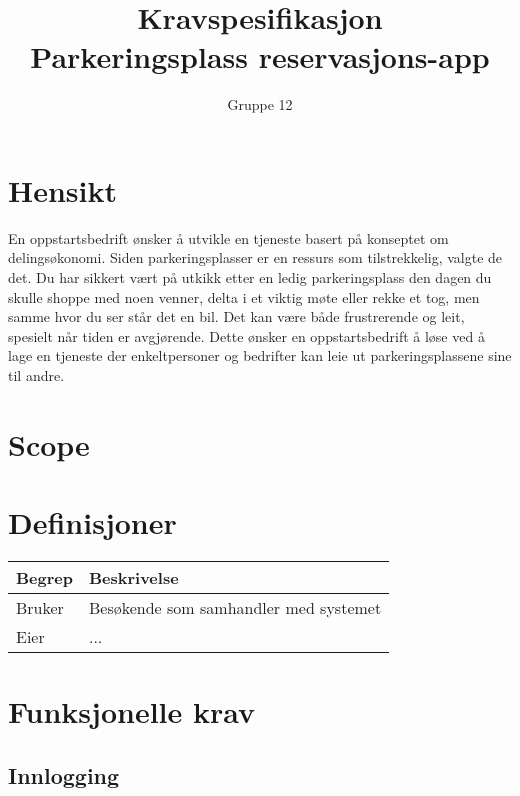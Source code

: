 \documentclass[12pt]{article}
\begin{document}
\title{%
    Kravspesifikasjon\\
    \large Parkeringsplass reservasjons-app }
\author{Gruppe 12}
\date{}
\maketitle

\newpage

\tableofcontents

\newpage

\section{Hensikt}
En oppstartsbedrift ønsker å utvikle en tjeneste basert på konseptet om delingsøkonomi. Siden parkeringsplasser er en ressurs som tilstrekkelig, valgte de det. Du har sikkert vært på utkikk etter en ledig parkeringsplass den dagen du skulle shoppe med noen venner, delta i et viktig møte eller rekke et tog, men samme hvor du ser står det en bil. Det kan være både frustrerende og leit, spesielt når tiden er avgjørende. Dette ønsker en oppstartsbedrift å løse ved å lage en tjeneste der enkeltpersoner og bedrifter kan leie ut parkeringsplassene sine til andre.

\section{Scope}

\section{Definisjoner}

\begin{center}
    \begin{tabular}{|p{4cm}|p{12cm}| } 
        \hline
        \bf Begrep & \bf Beskrivelse \\
        \hline
        Bruker & Besøkende som samhandler med systemet \\
        \hline
        Eier & ... \\
        \hline
    \end{tabular}
\end{center}

\section{Funksjonelle krav}

\subsection{Innlogging}
\end{document}

